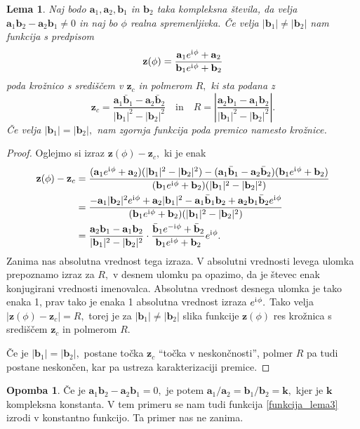 \documentclass[12pt,a4paper,twoside]{article}
\newcommand{\iu}{\mathrm{i}\mkern1mu} %
\theoremstyle{definition} %
\newtheorem{opomba}[definicija]{Opomba}
\theoremstyle{plain} %
\newtheorem{lema}[definicija]{Lema}
\theoremstyle{primerstyle}
\numberwithin{equation}{section}  %
\newcommand{\aV}{\mathbf{a}}
\newcommand{\bV}{\mathbf{b}}
\newcommand{\kV}{\mathbf{k}}
\newcommand{\zV}{\mathbf{z}}
\begin{document}
\begin{lema}
	\label{lema_3}
	Naj bodo $\aV_1,\aV_2,\bV_1$ in $\bV_2$ taka kompleksna števila, da velja $\aV_1\bV_2-\aV_2\bV_1\neq 0$ in naj bo $\phi$ realna spremenljivka. Če velja $|\bV_1|\neq|\bV_2|$ nam funkcija s predpisom
	\begin{equation}
		\label{funkcija_lema3}
		\zV(\phi)=\frac{\aV_1e^{\iu\phi}+\aV_2}{\bV_1e^{\iu\phi}+\bV_2}
	\end{equation}
	poda krožnico s središčem v $\zV_c$ in polmerom $R,$ ki sta podana z
	\begin{equation}
		\zV_c=\frac{\aV_1\bar{\bV}_1-\aV_2\bar{\bV}_2}{|\bV_1|^2-|\bV_2|^2}\quad\text{in}\quad R=\left|\frac{\aV_2\bV_1-\aV_1\bV_2}{|\bV_1|^2-|\bV_2|^2}\right|.
	\end{equation}
	Če velja $|\bV_1|=|\bV_2|,$ nam zgornja funkcija poda premico namesto krožnice.
\end{lema}
\begin{proof}
	Oglejmo si izraz $\zV(\phi)-\zV_c,$ ki je enak
	\begin{align*}
		\zV(\phi)-\zV_c&=\frac{(\aV_1e^{\iu\phi}+\aV_2)(|\bV_1|^2-|\bV_2|^2)-(\aV_1\bar{\bV}_1-\aV_2\bar{\bV}_2)(\bV_1e^{\iu\phi}+\bV_2)}{(\bV_1e^{\iu\phi}+\bV_2)(|\bV_1|^2-|\bV_2|^2)}\\
		&=\frac{-\aV_1|\bV_2|^2e^{\iu\phi}+\aV_2|\bV_1|^2-\aV_1\bar{\bV}_1\bV_2+\aV_2\bV_1\bar{\bV}_2e^{\iu\phi}}{(\bV_1e^{\iu\phi}+\bV_2)(|\bV_1|^2-|\bV_2|^2)}\\
		&=\frac{\aV_2\bV_1-\aV_1\bV_2}{|\bV_1|^2-|\bV_2|^2}\cdot\frac{\bar{\bV}_1e^{-\iu\phi}+\bar{\bV}_2}{\bV_1e^{\iu\phi}+\bV_2}e^{\iu\phi}.
	\end{align*}
	Zanima nas absolutna vrednost tega izraza. V absolutni vrednosti levega ulomka prepoznamo izraz za $R,$ v desnem ulomku pa opazimo, da je števec enak konjugirani vrednosti imenovalca. Absolutna vrednost desnega ulomka je tako enaka 1, prav tako je enaka 1 absolutna vrednost izraza $e^{\iu\phi}.$ Tako velja $|\zV(\phi)-\zV_c|=R,$ torej je za $|\bV_1|\neq|\bV_2|$ slika funkcije $\zV(\phi)$ res krožnica s središčem $\zV_c$ in polmerom $R.$
	
	Če je $|\bV_1|=|\bV_2|,$ postane točka $\zV_c$ ``točka v neskončnosti'', polmer $R$ pa tudi postane neskončen, kar pa ustreza karakterizaciji premice.
\end{proof}

\begin{opomba}
	Če je $\aV_1\bV_2-\aV_2\bV_1=0,$ je potem $\aV_1/\aV_2=\bV_1/\bV_2=\kV,$ kjer je $\kV$ kompleksna konstanta. V tem primeru se nam tudi funkcija \eqref{funkcija_lema3} izrodi v konstantno funkcijo. Ta primer nas ne zanima.
\end{opomba}
\end{document}
